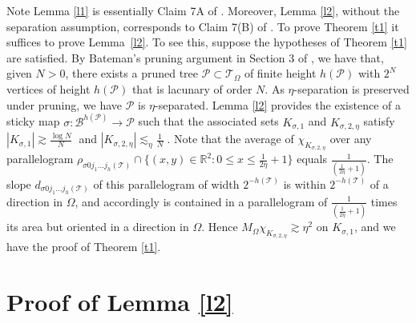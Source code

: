 \documentclass[12pt]{amsart}
\numberwithin{equation}{section}
\def\b#1{{\color{blue}#1}}
\def\r#1{{\color{red}#1}}
\theoremstyle{definition}
\theoremstyle{remark}
\def\b#1{{\color{blue}#1}}
\begin{document}



Note Lemma \ref{l1} is essentially Claim 7A of \cite{Ba}.   Moreover, Lemma \ref{l2}, without the separation assumption, corresponds to Claim 7(B) of \cite{Ba}. To prove Theorem \ref{t1} it suffices to prove \mbox{Lemma \ref{l2}.}  To see this, suppose the hypotheses of Theorem \ref{t1} are satisfied.   By Bateman's pruning argument in Section 3 of \cite{Ba},  we have that, given $N > 0$,  there exists  a pruned tree $\mathscr{P} \subset \mathscr{T}_\Omega$ of finite height $h(\mathscr{P})$ with $2^N$ vertices of height $h(\mathscr{P})$ that is lacunary of order $N$.  As $\eta$-separation is preserved under pruning, we have $\mathscr{P}$ is $\eta$-separated.  Lemma \ref{l2} provides the existence of  a sticky map $\sigma: \mathscr{B}^{h(\mathscr{P})} \rightarrow \mathscr{P}$ such that the associated sets $K_{\sigma, 1}$ and $K_{\sigma, 2, \eta}$ satisfy
 $|K_{\sigma, 1}| \gtrsim \frac{\log N}{N}\;$ and $|K_{\sigma, 2, \eta}| \lesssim_\eta \frac{1}{N}\;.$   
Note that the average of $\chi_{K_{\sigma,2,\eta}}$ over any parallelogram $\rho_{\sigma 0j_1\ldots j_h(\mathscr{T})}\cap \{(x,y)  \in \mathbb{R}^2: 0 \leq x \leq \frac{1}{2\eta} + 1\}$ equals $\frac{1}{(\frac{1}{2\eta} + 1)}$.   The slope $d_{\sigma 0j_1\ldots j_h(\mathscr{T})}$ of this parallelogram of width  $2^{-h(\mathscr{T})}$  is within $2^{-h(\mathscr{T})}$ of a direction in $\Omega$, and accordingly is contained in a parallelogram of $\frac{1}{(\frac{1}{2\eta} + 1)}$ times its area but oriented in a direction in $\Omega$.   Hence 
$M_\Omega \chi_{K_{\sigma, 2, \eta}} \gtrsim \eta^2$ on $K_{\sigma, 1}$, and we  have the proof of Theorem \ref{t1}. 

\section{Proof of Lemma \ref{l2}}\label{s3}
\end{document}
